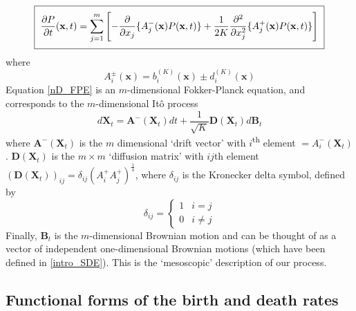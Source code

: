 \begin{equation}
\label{nD_FPE}
\setlength{\fboxsep}{2\fboxsep}\boxed{\frac{\partial P}{\partial t}(\mathbf{x},t) = \sum\limits_{j=1}^{m}\left[-\frac{\partial}{\partial x_j}\{A_j^{-}(\mathbf{x})P(\mathbf{x},t)\} + \frac{1}{2K}\frac{\partial^2}{\partial x_j^2}\{A_j^{+}(\mathbf{x})P(\mathbf{x},t)\}\right]}
\end{equation}
where
\begin{equation*}
A_{i}^{\pm}(\mathbf{x}) = b^{(K)}_i(\mathbf{x})\pm d^{(K)}_i(\mathbf{x})
\end{equation*}
Equation \eqref{nD_FPE} is an $m$-dimensional Fokker-Planck equation, and corresponds to the $m$-dimensional It\^o process
\begin{equation}
\label{nD_Ito_SDE}
d\mathbf{X}_{t} = \mathbf{A^-}(\mathbf{X}_t)dt + \frac{1}{\sqrt{K}}\mathbf{D}(\mathbf{X}_t)d\mathbf{B}_t
\end{equation}
where $\mathbf{A^-}(\mathbf{X}_t)$ is the $m$ dimensional `drift vector' with $i$\textsuperscript{th} element $ = A^{-}_{i}(\mathbf{X}_t)$. $\mathbf{D}(\mathbf{X}_t)$ is the $m \times m$ `diffusion matrix' with $ij$th element $\left(\mathbf{D}(\mathbf{X}_t)\right)_{ij} = \delta_{ij}\left(A^{+}_{i}A^{+}_{j}\right)^{\frac{1}{4}}$, where $\delta_{ij}$ is the Kronecker delta symbol, defined by
\begin{equation*}
\delta_{ij} = 
\begin{cases}
1 & i=j\\
0 & i\neq j
\end{cases}
\end{equation*}
Finally, $\mathbf{B}_t$ is the $m$-dimensional Brownian motion and can be thought of as a vector of independent one-dimensional Brownian motions (which have been defined in \ref{intro_SDE}). This is the `mesoscopic' description of our process.

\subsection{Functional forms of the birth and death rates}

